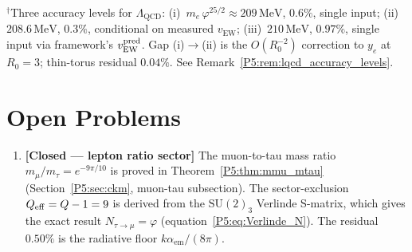 \documentclass[11pt,a4paper]{article}
\theoremstyle{definition}
\theoremstyle{remark}
\newcommand{\vp}{\varphi}
\newcommand{\vEW}{v_{\mathrm{EW}}}
\newcommand{\LQCD}{\Lambda_{\mathrm{QCD}}}
\newcommand{\deff}{d_{\mathrm{eff}}}
\newcommand{\aem}{\alpha_{\mathrm{em}}}
\begin{document}
\begin{center}
\end{center}
\noindent\footnotesize$^\dagger$\;Three accuracy levels for $\LQCD$:
(i)~$m_e\,\vp^{25/2}\approx209\,\mathrm{MeV}$, $0.6\%$, single input;
(ii)~$208.6\,\mathrm{MeV}$, $0.3\%$, conditional on measured $\vEW$;
(iii)~$210\,\mathrm{MeV}$, $0.97\%$, single input via framework's $\vEW^{\rm pred}$.
Gap (i)$\to$(ii) is the $O(R_0^{-2})$ correction to $y_e$ at $R_0=3$;
thin-torus residual $0.04\%$.
See Remark~\ref{P5:rem:lqcd_accuracy_levels}.\normalsize

\section{Open Problems}
\label{P5:sec:open}

\begin{enumerate}[noitemsep]
  \item \textbf{[Closed --- lepton ratio sector]}
    \label{P5:item:lepton_ratio}
    The muon-to-tau mass ratio $m_\mu/m_\tau = e^{-9\pi/10}$ is proved
    in Theorem~\ref{P5:thm:mmu_mtau}
    (Section~\ref{P5:sec:ckm}, muon-tau subsection).
    The sector-exclusion $Q_{\rm eff}=Q-1=9$ is derived from the
    $\mathrm{SU}(2)_3$ Verlinde S-matrix, which gives the exact result
    $N_{\tau\to\mu}=\vp$ (equation~\eqref{P5:eq:Verlinde_N}).
    The residual $0.50\%$ is the radiative floor $k\aem/(8\pi)$.
\end{enumerate}
\end{document}
